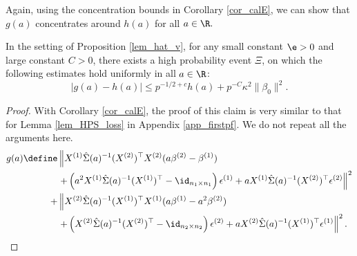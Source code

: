 \documentclass[aos,preprint]{imsart}
\begin{document}
Again, using the concentration bounds in Corollary \ref{cor_calE}, we can show that $g(a)$ concentrates around $h(a)$ for all $a\in \R.$
\begin{claim}\label{claim_largedev1}
 In the setting of Proposition \ref{lem_hat_v}, for any small constant $\e>0$ and large constant $C>0$, there exists a high probability event $\Xi$, on which the following estimates hold uniformly in all $a\in \R$: 
 $$\left| g(a) - h(a)\right| \le p^{-1/2+c}h(a) + p^{-C}\kappa^2 \|\beta_0\|^2 .$$ %
\end{claim}
\begin{proof}
With Corollary \ref{cor_calE}, the proof of this claim is very similar to that for Lemma \ref{lem_HPS_loss} in Appendix \ref{app_firstpf}. We do not repeat all the arguments here. 
\iffalse
\begin{align*}
		 g(a) \define & \left\| X^{(1)} \hat\Sigma(a)^{-1} (X^{(2)})^\top X^{(2)} (a\beta^{(2)}-\beta^{(1)}) \right. \nonumber\\
			& \left. + \left(a^2 X^{(1)}\hat \Sigma(a)^{-1} (X^{(1)})^\top-\id_{n_1\times n_1}\right)\epsilon^{(1)}+ a X^{(1)}\hat \Sigma(a)^{-1} (X^{(2)})^\top \epsilon^{(2)} \right\|^2 \nonumber\\
		   +& \left\| X^{(2)} \hat \Sigma(a)^{-1} (X^{(1)})^\top X^{(1)} (a\beta^{(1)}-a^2\beta^{(2)}) \right. \nonumber\\
		  &\left.+ \left(X^{(2)}\hat\Sigma(a)^{-1} (X^{(2)})^\top-\id_{n_2\times n_2}\right)\epsilon^{(2)} + a X^{(2)}\hat \Sigma(a)^{-1} (X^{(1)})^\top \epsilon^{(1)} \right\|^2. 
	\end{align*}


\end{proof}
\end{document}
